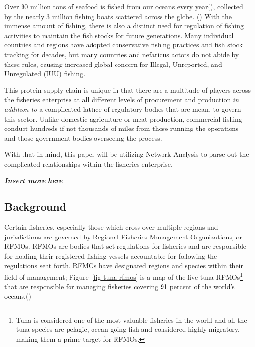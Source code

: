\documentclass[
  letterpaper,
  DIV=11,
  numbers=noendperiod]{scrartcl}
\begin{document}
Over 90 million tons of seafood is fished from our oceans every
year(), collected by the nearly 3 million fishing boats
scattered across the globe.
() With the
immense amount of fishing, there is also a distinct need for regulation
of fishing activities to maintain the fish stocks for future
generations. Many individual countries and regions have adopted
conservative fishing practices and fish stock tracking for decades, but
many countries and nefarious actors do not abide by these rules, causing
increased global concern for Illegal, Unreported, and Unregulated (IUU)
fishing.

This protein supply chain is unique in that there are a multitude of
players across the fisheries enterprise at all different levels of
procurement and production \emph{in addition to} a complicated lattice
of regulatory bodies that are meant to govern this sector. Unlike
domestic agriculture or meat production, commercial fishing conduct
hundreds if not thousands of miles from those running the operations and
those government bodies overseeing the process.

With that in mind, this paper will be utilizing Network Analysis to
parse out the complicated relationships within the fisheries enterprise.

\textbf{\emph{Insert more here}}

\subsection{Background}\label{background}

Certain fisheries, especially those which cross over multiple regions
and jurisdictions are governed by Regional Fisheries Management
Organizations, or RFMOs. RFMOs are bodies that set regulations for
fisheries and are responsible for holding their registered fishing
vessels accountable for following the regulations sent forth. RFMOs have
designated regions and species within their field of management;
Figure~\ref{fig-tuna-rfmos} is a map of the five tuna RFMOs\footnote{Tuna
  is considered one of the most valuable fisheries in the world and all
  the tuna species are pelagic, ocean-going fish and considered highly
  migratory, making them a prime target for RFMOs.} that are responsible
for managing fisheries covering 91 percent of the world's
oceans.()
\end{document}

